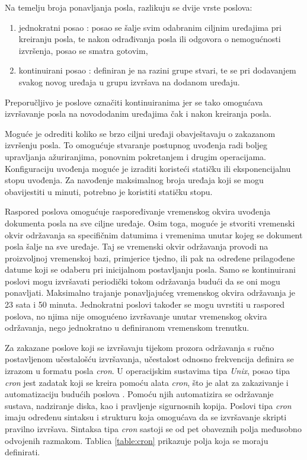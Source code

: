 Na temelju broja ponavljanja posla, razlikuju se dvije vrste poslova:
\begin{enumerate}
	\item jednokratni posao : posao se šalje svim odabranim ciljnim uređajima pri kreiranju posla, te nakon odrađivanja posla ili odgovora o nemogućnosti izvršenja, posao se smatra gotovim, 
	\item kontinuirani posao : definiran je na razini grupe stvari, te se pri dodavanjem svakog novog uređaja u grupu izvršava na dodanom uređaju. 
\end{enumerate}

Preporučljivo je poslove označiti kontinuiranima jer se tako omogućava izvršavanje posla na novododanim uređajima čak i nakon kreiranja posla. 

Moguće je odrediti koliko se brzo ciljni uređaji obavještavaju o zakazanom izvršenju posla. To omogućuje stvaranje postupnog uvođenja  radi boljeg upravljanja ažuriranjima, ponovnim pokretanjem i drugim operacijama. Konfiguraciju uvođenja moguće je izraditi koristeći statičku ili eksponencijalnu stopu uvođenja. Za navođenje maksimalnog broja uređaja koji se mogu obavijestiti u minuti, potrebno je koristiti statičku stopu. 

Raspored poslova omogućuje raspoređivanje vremenskog okvira uvođenja dokumenta posla na sve ciljne uređaje. Osim toga, moguće je stvoriti vremenski okvir održavanja sa specifičnim datumima i vremenima unutar kojeg se dokument posla šalje na sve uređaje. Taj se vremenski okvir održavanja provodi na proizvoljnoj vremenskoj bazi, primjerice tjedno, ili pak na određene prilagođene datume koji se odaberu pri inicijalnom postavljanju posla. Samo se kontinuirani poslovi mogu izvršavati periodički tokom održavanja budući da se oni mogu ponavljati. Maksimalno trajanje ponavljajućeg vremenskog okvira održavanja je 23 sata i 50 minuta. Jednokratni poslovi također se mogu uvrstiti u raspored poslova, no njima nije omogućeno izvršavanje unutar vremenskog okvira održavanja, nego jednokratno u definiranom vremenskom trenutku. 

Za zakazane poslove koji se izvršavaju tijekom prozora održavanja s ručno postavljenom učestalošću izvršavanja, učestalost odnosno frekvencija definira se izrazom u formatu posla \textit{cron}. U operacijskim sustavima tipa \textit{Unix}, posao tipa \textit{cron} jest zadatak koji se kreira pomoću alata \textit{cron}, što je alat za zakazivanje i automatizaciju budućih poslova \cite{cron}. Pomoću njih automatizira se održavanje sustava, nadziranje diska, kao i pravljenje sigurnosnih kopija. Poslovi tipa \textit{cron} imaju određenu sintaksu i strukturu koja omogućava da se izvršavanje skripti pravilno izvršava. Sintaksa tipa \textit{cron} sastoji se od pet obaveznih polja međusobno odvojenih razmakom. Tablica \ref{table:cron} prikazuje polja koja se moraju definirati. 

